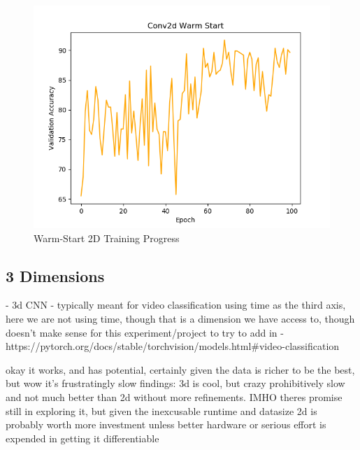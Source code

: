 \documentclass[10pt,twocolumn,letterpaper]{article}
\begin{document}
 \begin{figure}
  \includegraphics[width=\linewidth]{images/2d_warm.png}
  \caption{Warm-Start 2D Training Progress}
  \label{fig:2d_warm}
\end{figure}

\subsection{3 Dimensions}\label{subsec:3-dimensions}
- 3d CNN - typically meant for video classification using time as the third axis,
here we are not using time, though that is a dimension we have access to,
though doesn't make sense for this experiment/project to try to add in
- https://pytorch.org/docs/stable/torchvision/models.html#video-classification


okay it works, and has potential, certainly given the data is richer to be the best, but wow it's frustratingly slow
findings: 3d is cool, but crazy prohibitively slow and not much better than 2d without more refinements. IMHO theres
promise still in exploring it, but given the inexcusable runtime and datasize 2d is probably worth more investment
unless better hardware or serious effort is expended in getting it differentiable
\end{document}
